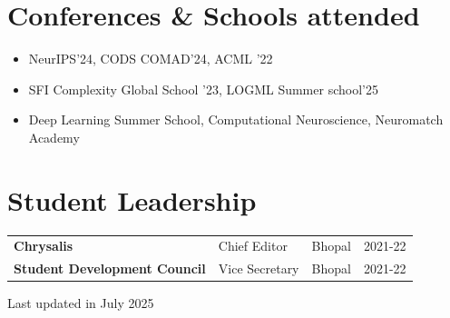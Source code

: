 \documentclass[10pt, letterpaper]{article}
\begin{document}
\section{Conferences \& Schools attended}

\begin{itemize}
  \item NeurIPS'24, CODS COMAD'24, ACML '22
  \item SFI Complexity Global School '23, LOGML Summer school'25
  \item Deep Learning Summer School, Computational Neuroscience, Neuromatch Academy
\end{itemize}

\section{Student Leadership}

\begin{tabularx}{\linewidth}{@{} X l l r @{}}
  \textbf{Chrysalis}                   & Chief Editor   & Bhopal & 2021-22 \\[2pt]
  \textbf{Student Development Council} & Vice Secretary & Bhopal & 2021-22 \\
\end{tabularx}

\vfill
\begin{center}
  \small\color{muted}
  Last updated in July 2025
\end{center}
\end{document}
